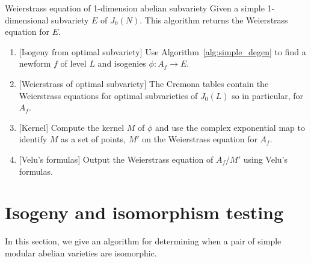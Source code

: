 \begin{algorithm}{Weierstrass equation of 1-dimension abelian subvariety}%
    \label{alg:weierstrass}
    Given a simple 1-dimensional subvariety $E$ of $J_0(N)$. This algorithm
    returns the Weierstrass equation for $E$.
    \begin{enumerate}
        \item{}
            [Isogeny from optimal subvariety] Use
            Algorithm~\ref{alg:simple_degen} to find a newform $f$ of level
            $L$ and isogenies $\phi:A_f\to E$.
        \item{}
            [Weierstrass of optimal subvariety] The Cremona tables contain the
            Weierstrass equations for optimal subvarieties of $J_0(L)$ so in
            particular, for $A_f$.
        \item{}
            [Kernel] Compute the kernel $M$ of $\phi$ and use the complex
            exponential map to identify $M$ as a set of points, $M'$ on the
            Weierstrass equation for $A_f$.
        \item{}
            [Velu's formulas] Output the Weierstrass equation of $A_f/M'$ using
            Velu's formulas.
    \end{enumerate}
\end{algorithm}




\section{Isogeny and isomorphism testing}

In this section, we give an algorithm for determining when a pair of simple
modular abelian varieties are isomorphic.

